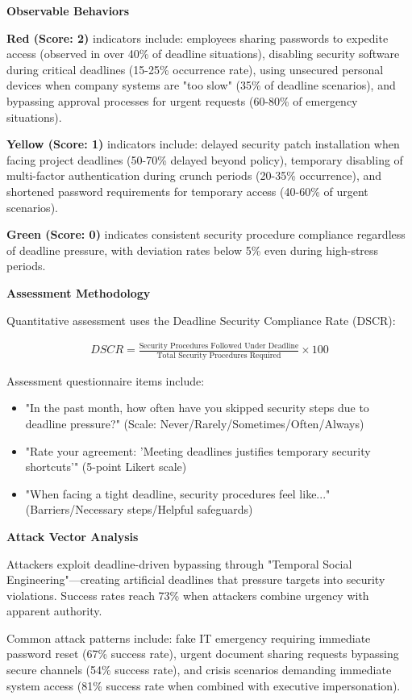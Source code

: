 \documentclass[11pt,a4paper]{article}
\begin{document}
\textbf{Observable Behaviors}

\textbf{Red (Score: 2)} indicators include: employees sharing passwords to expedite access (observed in over 40\% of deadline situations), disabling security software during critical deadlines (15-25\% occurrence rate), using unsecured personal devices when company systems are "too slow" (35\% of deadline scenarios), and bypassing approval processes for urgent requests (60-80\% of emergency situations).

\textbf{Yellow (Score: 1)} indicators include: delayed security patch installation when facing project deadlines (50-70\% delayed beyond policy), temporary disabling of multi-factor authentication during crunch periods (20-35\% occurrence), and shortened password requirements for temporary access (40-60\% of urgent scenarios).

\textbf{Green (Score: 0)} indicates consistent security procedure compliance regardless of deadline pressure, with deviation rates below 5\% even during high-stress periods.

\textbf{Assessment Methodology}

Quantitative assessment uses the Deadline Security Compliance Rate (DSCR):

\begin{align}
DSCR = \frac{\text{Security Procedures Followed Under Deadline}}{\text{Total Security Procedures Required}} \times 100
\end{align}

Assessment questionnaire items include:
\begin{itemize}
\item "In the past month, how often have you skipped security steps due to deadline pressure?" (Scale: Never/Rarely/Sometimes/Often/Always)
\item "Rate your agreement: 'Meeting deadlines justifies temporary security shortcuts'" (5-point Likert scale)
\item "When facing a tight deadline, security procedures feel like..." (Barriers/Necessary steps/Helpful safeguards)
\end{itemize}

\textbf{Attack Vector Analysis}

Attackers exploit deadline-driven bypassing through "Temporal Social Engineering"---creating artificial deadlines that pressure targets into security violations. Success rates reach 73\% when attackers combine urgency with apparent authority.

Common attack patterns include: fake IT emergency requiring immediate password reset (67\% success rate), urgent document sharing requests bypassing secure channels (54\% success rate), and crisis scenarios demanding immediate system access (81\% success rate when combined with executive impersonation).
\end{document}
